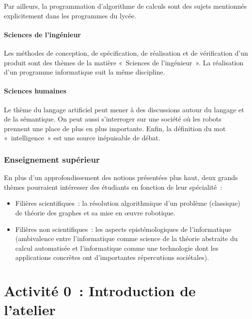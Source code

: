 \documentclass[11pt,a4paper]{article}
\begin{document}
Par ailleurs, la programmation d'algorithme de calculs sont des sujets
mentionnés explicitement dans les programmes du lycée.

\paragraph{Sciences de l'ingénieur}

Les méthodes de conception, de spécification, de réalisation et de
vérification d'un produit sont des thèmes de la matière «~Sciences de
  l'ingénieur~». La réalisation d'un programme informatique suit la
même discipline.

\paragraph{Sciences humaines}

Le thème du langage artificiel peut mener à des discussions autour du
langage et de la sémantique. On peut aussi s'interroger sur une société
où les robots prennent une place de plus en plus importante. Enfin, 
la définition du mot «~intelligence~» est une source inépuisable de débat.

\subsubsection{Enseignement supérieur}

En plus d'un approfondissement des notions présentées plus haut, deux
grands thèmes pourraient intéresser des étudiants en fonction de leur spécialité~: 

\begin{itemize}
\item Filières scientifiques~: la résolution algorithmique d'un problème (classique) de théorie
  des graphes et sa mise en {\oe}uvre robotique. 

\item Filières non scientifiques~: les aspects epistémologiques de
  l'informatique (ambivalence entre l'informatique comme science de la
  théorie abstraite du calcul automatisée et l'informatique comme une
  technologie dont les applications concrètes ont d'importantes
  répercutions sociétales).

\end{itemize}

\newpage
\section{Activité 0~: Introduction de l'atelier}
\end{document}
